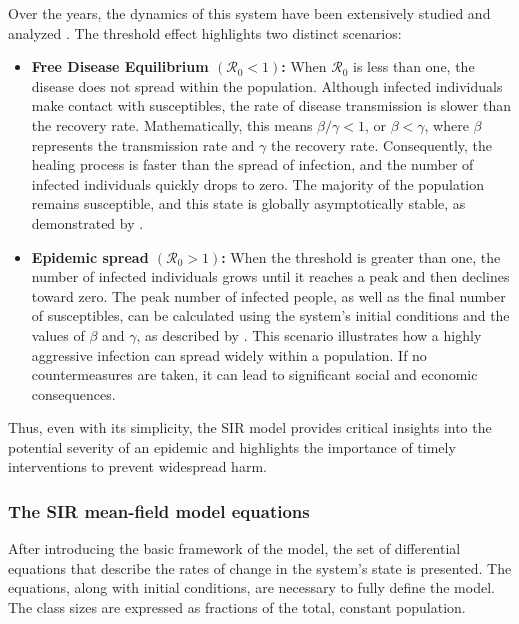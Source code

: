 Over the years, the dynamics of this system have been extensively studied and analyzed \cite{Breda_2012, akinboro2014numerical, Jard_n_Kojakhmetov_2021, Ledder_2023, Okabe_2020, Prodanov_2022, Xu_2014, Turkyilmazoglu_2021}. The threshold effect highlights two distinct scenarios:
\begin{itemize}
	\item \textbf{Free Disease Equilibrium $(\mathcal{R}_0 < 1)$:} When $\mathcal{R}_0$ is less than one, the disease does not spread within the population. Although infected individuals make contact with susceptibles, the rate of disease transmission is slower than the recovery rate. Mathematically, this means $\beta / \gamma < 1$, or $\beta < \gamma$, where $\beta$ represents the transmission rate and $\gamma$ the recovery rate. Consequently, the healing process is faster than the spread of infection, and the number of infected individuals quickly drops to zero. The majority of the population remains susceptible, and this state is globally asymptotically stable, as demonstrated by \cite{Hernandez_Vargas_2022}.
	\item \textbf{Epidemic spread $(\mathcal{R}_0 > 1)$:}     When the threshold is greater than one, the number of infected individuals grows until it reaches a peak and then declines toward zero. The peak number of infected people, as well as the final number of susceptibles, can be calculated using the system's initial conditions and the values of $\beta$ and $\gamma$, as described by \cite{Hethcote_2000}. This scenario illustrates how a highly aggressive infection can spread widely within a population. If no countermeasures are taken, it can lead to significant social and economic consequences.
\end{itemize}
	Thus, even with its simplicity, the SIR model provides critical insights into the potential severity of an epidemic and highlights the importance of timely interventions to prevent widespread harm.
	

\subsubsection{The SIR mean-field model equations}
After introducing the basic framework of the model, the set of differential equations that describe the rates of change in the system's state is presented. The equations, along with initial conditions, are necessary to fully define the model. The class sizes are expressed as fractions of the total, constant population.

